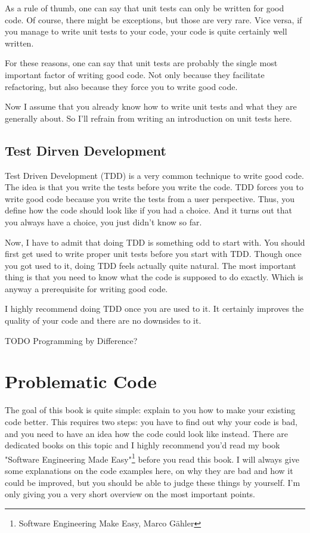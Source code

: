 As a rule of thumb, one can say that unit tests can only be written for good code. Of course, there might be exceptions, but those are very rare. Vice versa, if you manage to write unit tests to your code, your code is quite certainly well written.

For these reasons, one can say that unit tests are probably the single most important factor of writing good code. Not only because they facilitate refactoring, but also because they force you to write good code.

Now I assume that you already know how to write unit tests and what they are generally about. So I'll refrain from writing an introduction on unit tests here. 

\section{Test Dirven Development}\label{chap:tdd}

Test Driven Development (TDD) is a very common technique to write good code. The idea is that you write the tests before you write the code. TDD forces you to write good code because you write the tests from a user perspective. Thus, you define how the code should look like if you had a choice. And it turns out that you always have a choice, you just didn't know so far.

Now, I have to admit that doing TDD is something odd to start with. You should first get used to write proper unit tests before you start with TDD. Though once you got used to it, doing TDD feels actually quite natural. The most important thing is that you need to know what the code is supposed to do exactly. Which is anyway a prerequisite for writing good code.

I highly recommend doing TDD once you are used to it. It certainly improves the quality of your code and there are no downsides to it.

TODO Programming by Difference?

\chapter{Problematic Code}

The goal of this book is quite simple: explain to you how to make your existing code better. This requires two steps: you have to find out why your code is bad, and you need to have an idea how the code could look like instead. There are dedicated books on this topic and I highly recommend you'd read my book "Software Engineering Made Easy"\footnote{Software Engineering Make Easy, Marco Gähler} before you read this book. I will always give some explanations on the code examples here, on why they are bad and how it could be improved, but you should be able to judge these things by yourself. I'm only giving you a very short overview on the most important points.

